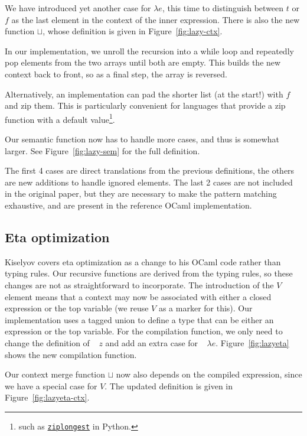\documentclass[conference]{IEEEtran}
\DeclareMathOperator{\lazyeta}{lazy_\eta}
\begin{document}
We have introduced yet another case for $\lambda e$, this time to distinguish between $t$ or $f$ as the last element in the context of the inner expression.
There is also the new function $\sqcup$, whose definition is given in Figure~\ref{fig:lazy-ctx}.

In our implementation, we unroll the recursion into a while loop and repeatedly pop elements from the two arrays until both are empty.
This builds the new context back to front, so as a final step, the array is reversed.

Alternatively, an implementation can pad the shorter list (at the start!) with $f$ and zip them.
This is particularly convenient for languages that provide a zip function with a default value\footnote{such as \href{https://docs.python.org/3/library/itertools.html\#itertools.zip\_longest}{\texttt{ziplongest}} in Python.}.

Our semantic function now has to handle more cases, and thus is somewhat larger.
See Figure~\ref{fig:lazy-sem} for the full definition.

The first 4 cases are direct translations from the previous definitions, the others are new additions to handle ignored elements.
The last 2 cases are not included in the original paper, but they are necessary to make the pattern matching exhaustive, and are present in the reference OCaml implementation.

\subsection{Eta optimization}
Kiselyov covers eta optimization as a change to his OCaml code rather than typing rules.
Our recursive functions are derived from the typing rules, so these changes are not as straightforward to incorporate.
The introduction of the $V$ element means that a context may now be associated with either a closed expression or the top variable (we reuse $V$ as a marker for this).
Our implementation uses a tagged union to define a type that can be either an expression or the top variable.
For the compilation function, we only need to change the definition of $\lazyeta \ z$ and add an extra case for $\lazyeta \ \lambda e$.
Figure~\ref{fig:lazyeta} shows the new compilation function.

Our context merge function $\sqcup$ now also depends on the compiled expression, since we have a special case for $V$.
The updated definition is given in Figure~\ref{fig:lazyeta-ctx}.
\end{document}
